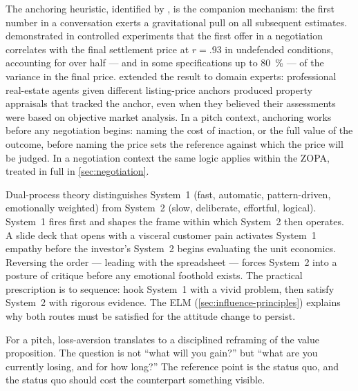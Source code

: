 The anchoring heuristic, identified by \textcite{tversky1974judgment}, is the companion
mechanism: the first number in a conversation exerts a gravitational pull on all subsequent
estimates. \textcite{galinsky2001anchoring} demonstrated in controlled experiments that
the first offer in a negotiation correlates with the final settlement price at
$r = .93$ in undefended conditions, accounting for over half --- and in some specifications
up to \qty{80}{\percent} --- of the variance in the final price.
\textcite{northcraft1987anchoring} extended the result to domain experts: professional
real-estate agents given different listing-price anchors produced property appraisals that
tracked the anchor, even when they believed their assessments were based on objective
market analysis.
In a pitch context, anchoring works before any negotiation begins: naming the cost of
inaction, or the full value of the outcome, before naming the price sets the reference
against which the price will be judged. In a negotiation context the same logic applies
within the ZOPA, treated in full in \cref{sec:negotiation}.

Dual-process theory distinguishes System~1 (fast, automatic, pattern-driven, emotionally
weighted) from System~2 (slow, deliberate, effortful, logical). System~1 fires first and
shapes the frame within which System~2 then operates. A slide deck that opens with a
visceral customer pain activates System~1 empathy before the investor's System~2 begins
evaluating the unit economics. Reversing the order --- leading with the spreadsheet ---
forces System~2 into a posture of critique before any emotional foothold exists. The
practical prescription is to sequence: hook System~1 with a vivid problem, then satisfy
System~2 with rigorous evidence. The ELM (\cref{sec:influence-principles}) explains why
both routes must be satisfied for the attitude change to persist.

For a pitch, loss-aversion translates to a disciplined reframing of the value proposition.
The question is not ``what will you gain?'' but ``what are you currently losing, and for
how long?'' The reference point is the status quo, and the status quo should cost the
counterpart something visible.

